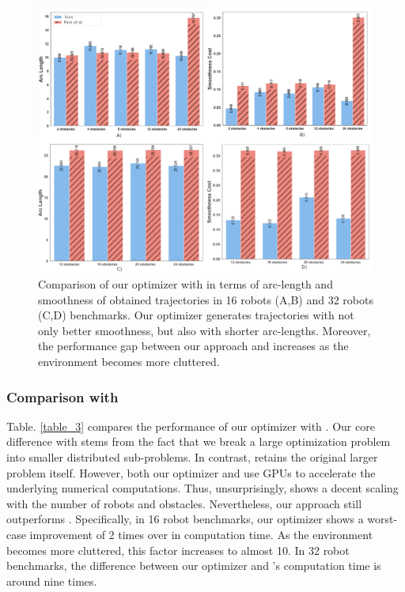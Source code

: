 \begin{figure}
    \centering
    \includegraphics{figures/gpu_mat/quantitative_benchmark.jpg}
    \caption[Quantitative Benchmark against Multi-Robot State-of-the-Art]{Comparison of our optimizer with \citep{park2020efficient} in terms of arc-length and smoothness of obtained trajectories in 16 robots (A,B) and 32 robots (C,D) benchmarks. Our optimizer generates trajectories with not only better smoothness, but also with shorter arc-lengths. Moreover, the performance gap between our approach and \citep{park2020efficient} increases as the environment becomes more cluttered.}
    \label{figure7}
\end{figure}


\subsubsection{Comparison with \citep{aks_ral21}}
Table. \ref{table_3} compares the performance of our optimizer with \citep{aks_ral21}. Our core difference with \citep{aks_ral21} stems from the fact that we break a large optimization problem into smaller distributed sub-problems. In contrast, \citep{aks_ral21} retains the original larger problem itself. However, both our optimizer and  \citep{aks_ral21} use GPUs to accelerate the underlying numerical computations. Thus, unsurprisingly, \citep{aks_ral21} shows a decent scaling with the number of robots and obstacles. Nevertheless, our approach still outperforms \citep{aks_ral21}. Specifically, in 16 robot benchmarks, our optimizer shows a worst-case improvement of 2 times over \citep{aks_ral21} in computation time. As the environment becomes more cluttered, this factor increases to almost 10. In 32 robot benchmarks, the difference between our optimizer and \citep{aks_ral21}'s computation time is around nine times.

